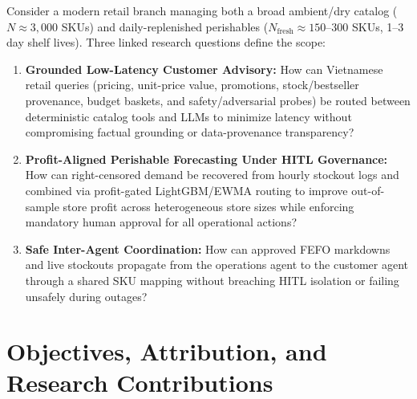 Consider a modern retail branch managing both a broad ambient/dry catalog ($N \approx 3{,}000$ SKUs) and daily-replenished perishables ($N_{\text{fresh}} \approx 150$--$300$ SKUs, 1--3 day shelf lives). Three linked research questions define the scope:
\begin{enumerate}
    \item \textbf{Grounded Low-Latency Customer Advisory:} How can Vietnamese retail queries (pricing, unit-price value, promotions, stock/bestseller provenance, budget baskets, and safety/adversarial probes) be routed between deterministic catalog tools and LLMs to minimize latency without compromising factual grounding or data-provenance transparency?
    \item \textbf{Profit-Aligned Perishable Forecasting Under HITL Governance:} How can right-censored demand be recovered from hourly stockout logs and combined via profit-gated LightGBM/EWMA routing to improve out-of-sample store profit across heterogeneous store sizes while enforcing mandatory human approval for all operational actions?
    \item \textbf{Safe Inter-Agent Coordination:} How can approved FEFO markdowns and live stockouts propagate from the operations agent to the customer agent through a shared SKU mapping without breaching HITL isolation or failing unsafely during outages?
\end{enumerate}

\section{Objectives, Attribution, and Research Contributions}

